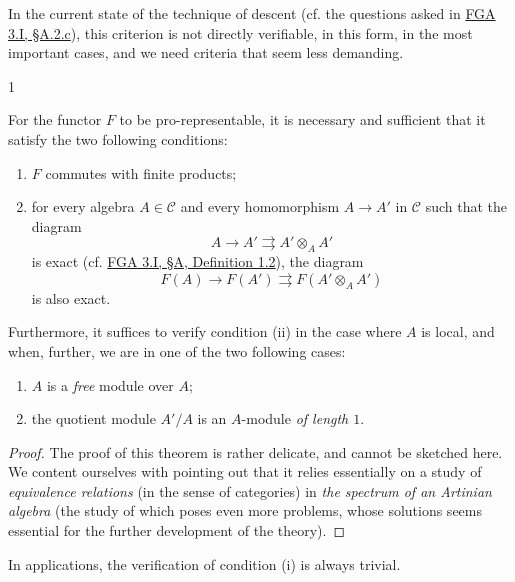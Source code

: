   In the current state of the technique of descent (cf. the questions asked in \hyperref[fga3.i-a.2.c]{FGA 3.I, §A.2.c}), this criterion is not directly verifiable, in this form, in the most important cases, and we need criteria that seem less demanding.\begin{theorem}{1}\label{fga3.ii-b-theorem-1}\skipsinglepar\par{}For the functor \(F\) to be pro-representable, it is necessary and sufficient that it satisfy the two following conditions:

    
 \begin{enumerate}
      
 \item[i.]
        \(F\) commutes with finite products;
      

      
 \item[ii.]
        for every algebra \(A\in \mathcal {C}\) and every homomorphism \(A\to  A'\) in \(\mathcal {C}\) such that the diagram
        \[           A \to  A' \rightrightarrows  A'\otimes _A A'         \]
        is exact (cf. \hyperref[fga3.i-a.1-definition-1.2]{FGA 3.I, §A, Definition 1.2}), the diagram
        \[           F(A) \to  F(A') \rightrightarrows  F(A'\otimes _A A')         \]
        is also exact.
      

    \end{enumerate}


    
    Furthermore, it suffices to verify condition (ii) in the case where \(A\) is local, and when, further, we are in one of the two following cases:

    
 \begin{enumerate}
      
 \item[a.]
        \(A\) is a \emph{free} module over \(A\);
      

      
 \item[b.]
        the quotient module \(A'/A\) is an \(A\)-module \emph{of length \(1\)}.
      

    \end{enumerate}\begin{proof}\par{}The proof of this theorem is rather delicate, and cannot be sketched here.
      We content ourselves with pointing out that it relies essentially on a study of \emph{equivalence relations} (in the sense of categories) in \emph{the spectrum of an Artinian algebra} (the study of which poses even more problems, whose solutions seems essential for the further development of the theory).\end{proof}\end{theorem}\par{}In applications, the verification of condition (i) is always trivial.
